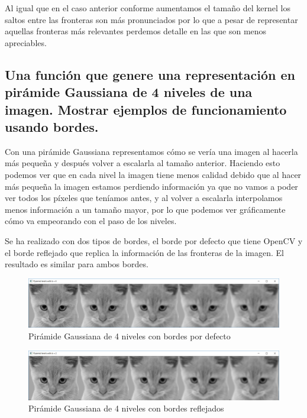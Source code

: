 \documentclass{article}
\begin{document}
Al igual que en el caso anterior conforme aumentamos el tamaño del kernel los saltos entre las fronteras son más pronunciados por lo que a pesar de representar aquellas fronteras más relevantes perdemos detalle en las que son menos apreciables.

\newpage
\subsection{Una función que genere una representación en pirámide Gaussiana de 4 niveles de una imagen. Mostrar ejemplos de funcionamiento usando bordes.}
Con una pirámide Gaussiana representamos cómo se vería una imagen al hacerla más pequeña y después volver a escalarla al tamaño anterior. Haciendo esto podemos ver que en cada nivel la imagen tiene menos calidad debido que al hacer más pequeña la imagen estamos perdiendo información ya que no vamos a poder ver todos los píxeles que teníamos antes, y al volver a escalarla interpolamos menos información a un tamaño mayor, por lo que podemos ver gráficamente cómo va empeorando con el paso de los niveles.

Se ha realizado con dos tipos de bordes, el borde por defecto que tiene OpenCV y el borde reflejado que replica la información de las fronteras de la imagen. El resultado es similar para ambos bordes.


\begin{figure}[h]
\centering
\includegraphics[scale=0.4]{2d1.PNG}
\caption{Pirámide Gaussiana de 4 niveles con bordes por defecto}
\end{figure}

\begin{figure}[h]
\centering
\includegraphics[scale=0.4]{2d2.PNG}
\caption{Pirámide Gaussiana de 4 niveles con bordes reflejados}
\end{figure}

\newpage
\end{document}
